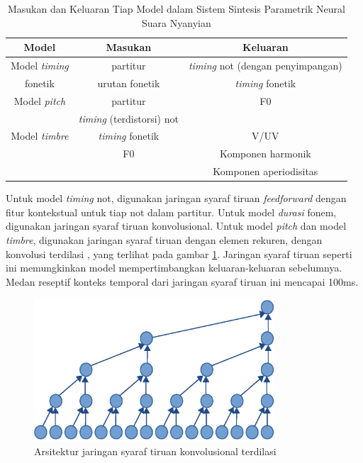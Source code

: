 \begin{table}[h]
	\centering
    \caption{Masukan dan Keluaran Tiap Model dalam Sistem Sintesis Parametrik Neural Suara Nyanyian \parencite{bonada2017singing}}\label{tab-models-in-out-bonada}
	\begin{tabular}{ |c|c|c| } 
	 \hline
	 Model & Masukan & Keluaran \\
	 \hline 
	 Model \textit{timing} & partitur & \textit{timing} not (dengan penyimpangan) \\ 
	 fonetik  & urutan fonetik & \textit{timing} fonetik \\ 
	 \hline
	 Model \textit{pitch} & partitur & F0 \\ 
	  & \textit{timing} (terdistorsi) not  & \\ 
	 \hline
	 Model \textit{timbre} &  \textit{timing} fonetik & V/UV \\ 
	  & F0 & Komponen harmonik\\ 
	  &   & Komponen aperiodisitas\\ 
	 \hline
	\end{tabular}
\end{table}

Untuk model \textit{timing} not, digunakan jaringan syaraf tiruan \textit{feedforward} dengan fitur kontekstual untuk tiap not dalam partitur. Untuk model \textit{durasi} fonem, digunakan jaringan syaraf tiruan konvolusional. \parencite{bonada2017singing} Untuk model \textit{pitch} dan model \textit{timbre}, digunakan jaringan syaraf tiruan dengan elemen rekuren, dengan konvolusi terdilasi \parencite{Oord2016WaveNetAG}, yang terlihat pada gambar \ref{fig-dilated-cnn}. Jaringan syaraf tiruan seperti ini memungkinkan model mempertimbangkan keluaran-keluaran sebelumnya. Medan reseptif konteks temporal dari jaringan syaraf tiruan ini mencapai 100ms. \parencite{bonada2017singing}

\begin{figure}[h]
    \centering
    \includegraphics[width=0.8\textwidth]{resources/dilated-cnn.eps}
    \caption{Arsitektur jaringan syaraf tiruan konvolusional terdilasi \parencite{Oord2016WaveNetAG}}\label{fig-dilated-cnn}
\end{figure}